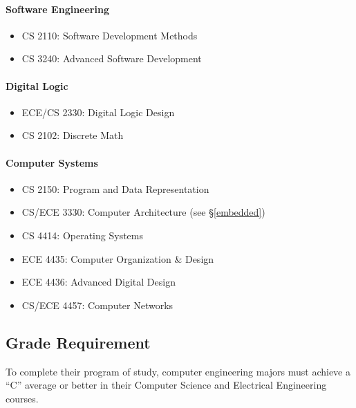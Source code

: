 \documentclass[10pt,letter]{book}
\newenvironment{itemlist}{
\begin{itemize}
\setlength{\itemsep}{0pt}
\setlength{\parskip}{0pt}}
{\end{itemize}}
\begin{document}
\paragraph{Software Engineering}
\begin{itemlist}
\item CS 2110: Software Development Methods
\item CS 3240: Advanced Software Development
\end{itemlist}

\paragraph{Digital Logic}
\begin{itemlist}
\item ECE/CS 2330: Digital Logic Design
\item CS 2102: Discrete Math
\end{itemlist}

\paragraph{Computer Systems}
\begin{itemlist}
\item CS 2150: Program and Data Representation
\item CS/ECE 3330: Computer Architecture (see \S\ref{embedded})
\item CS 4414: Operating Systems
\item ECE 4435: Computer Organization \& Design
\item ECE 4436: Advanced Digital Design
\item CS/ECE 4457: Computer Networks
\end{itemlist}

\subsection{Grade Requirement}
To complete their program of study, computer engineering majors must
achieve a “C” average or better in their Computer Science and
Electrical Engineering courses.


\end{document}
